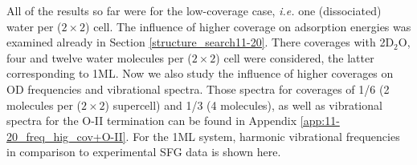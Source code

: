 \documentclass[11pt,DIV=13,BCOR=5mm,a4paper,headinclude]{scrbook}
\newcommand\todo[1]{\textcolor{red}{TODO: \textit{{#1}}}}
\begin{document}


All of the results so far were for the low-coverage case, \textit{i.e.} one (dissociated) water per ($2\times 2$) cell.
The influence of higher coverage on adsorption energies was examined already in Section \ref{structure_search11-20}.
There coverages with 2D$_2$O, four and twelve water molecules per ($2\times 2$) cell were considered, the latter corresponding to 1ML.
Now we also study the influence of higher coverages on OD frequencies and vibrational spectra.
Those spectra for coverages of 1/6 (2 molecules per ($2\times 2$) supercell) and 1/3 (4 molecules), as well as vibrational spectra for the O-II termination can be found in Appendix \ref{app:11-20_freq_hig_cov+O-II}.
For the 1ML system, harmonic vibrational frequencies in comparison to experimental SFG data is shown here.
\end{document}
